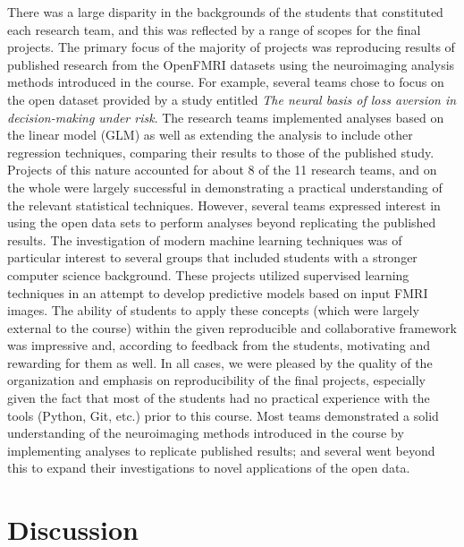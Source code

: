 There was a large disparity in the backgrounds of the students that constituted 
each research team, and this was reflected by a range of scopes for the
final projects.
The primary focus of the majority of projects was reproducing results
of published research from the OpenFMRI datasets using the neuroimaging 
analysis methods introduced in the course.
For example, several teams chose to focus on the open dataset provided by a
study entitled \textit{The neural basis of loss aversion in decision-making
under risk}\cite{tom2007neural}.
The research teams implemented analyses based on the linear model (GLM) as
well as extending the analysis to include other regression techniques, comparing
their results to those of the published study.
Projects of this nature accounted for about 8 of the 11 research teams, and
on the whole were largely successful in demonstrating a practical understanding
of the relevant statistical techniques.
However, several teams expressed interest in using the open data sets to 
perform analyses beyond replicating the published results.
The investigation of modern machine learning techniques was of particular 
interest to several groups that included students with a stronger computer
science background.
These projects utilized supervised learning techniques in an attempt to 
develop predictive models based on input FMRI images.
The ability of students to apply these concepts (which were largely external
to the course) within the given reproducible and collaborative 
framework was impressive and, according to feedback from the students,
motivating and rewarding for them as well.
In all cases, we were pleased by the quality of the organization and emphasis
on reproducibility of the final projects, especially given the fact that
most of the students had no practical experience with the tools (Python, Git,
etc.) prior to this course.
Most teams demonstrated a solid understanding of the neuroimaging methods introduced
in the course by implementing analyses to replicate published results; and 
several went beyond this to expand their investigations to novel applications
of the open data.


\section{Discussion}\label{discussion}

